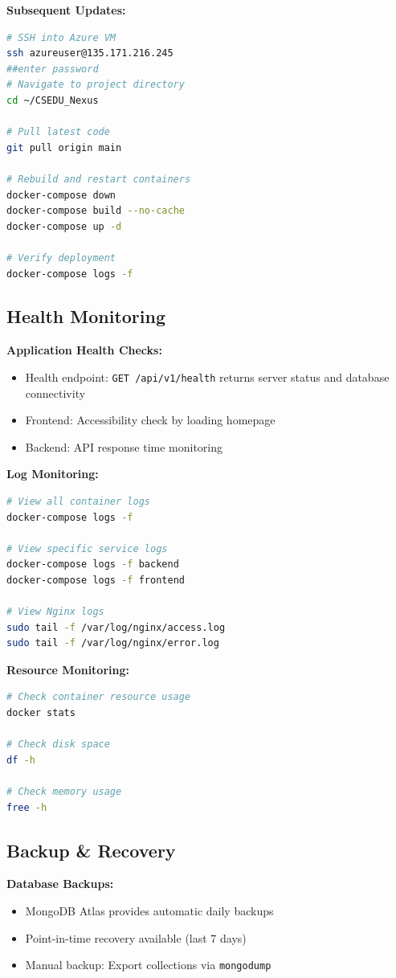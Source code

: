 \documentclass[12pt,a4paper]{article}
\begin{document}
\textbf{Subsequent Updates:}

\begin{lstlisting}[language=bash]
# SSH into Azure VM
ssh azureuser@135.171.216.245
##enter password
# Navigate to project directory
cd ~/CSEDU_Nexus

# Pull latest code
git pull origin main

# Rebuild and restart containers
docker-compose down
docker-compose build --no-cache
docker-compose up -d

# Verify deployment
docker-compose logs -f
\end{lstlisting}

\subsection{Health Monitoring}

\textbf{Application Health Checks:}
\begin{itemize}[noitemsep]
  \item Health endpoint: \texttt{GET /api/v1/health} returns server status and database connectivity
  \item Frontend: Accessibility check by loading homepage
  \item Backend: API response time monitoring
\end{itemize}

\textbf{Log Monitoring:}
\begin{lstlisting}[language=bash]
# View all container logs
docker-compose logs -f

# View specific service logs
docker-compose logs -f backend
docker-compose logs -f frontend

# View Nginx logs
sudo tail -f /var/log/nginx/access.log
sudo tail -f /var/log/nginx/error.log
\end{lstlisting}

\textbf{Resource Monitoring:}
\begin{lstlisting}[language=bash]
# Check container resource usage
docker stats

# Check disk space
df -h

# Check memory usage
free -h
\end{lstlisting}

\subsection{Backup \& Recovery}

\textbf{Database Backups:}
\begin{itemize}[noitemsep]
  \item MongoDB Atlas provides automatic daily backups
  \item Point-in-time recovery available (last 7 days)
  \item Manual backup: Export collections via \texttt{mongodump}
\end{itemize}
\end{document}
